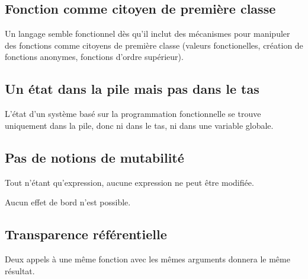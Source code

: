 \documentclass{article}
\begin{document}
\begin{lstlisting}[language=ruby]
\end{lstlisting}

\subsection{Fonction comme citoyen de première classe}
Un langage semble fonctionnel dès qu'il inclut des mécanismes pour manipuler des
fonctions comme citoyens de première classe (valeurs fonctionelles, création de
fonctions anonymes, fonctions d'ordre supérieur).

\subsection{Un état dans la pile mais pas dans le tas}
L'état d'un système basé sur la programmation fonctionnelle se trouve uniquement
dans la pile, donc ni dans le tas, ni dans une variable globale.

\subsection{Pas de notions de mutabilité}
Tout n'étant qu'expression, aucune expression ne peut être modifiée.

Aucun effet de bord n'est possible.

\subsection{Transparence référentielle}
Deux appels à une même fonction avec les mêmes arguments donnera le même résultat.

\subsection{}


\subsection{}

\section{}
\subsection{}
\subsection{}
\end{document}
